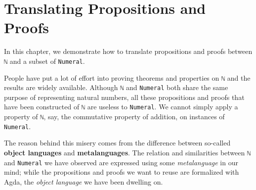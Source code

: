 \documentclass[\main/thesis.tex]{subfiles}
\begin{document}
\chapter{Translating Propositions and Proofs}\label{translation}

In this chapter, we demonstrate how to translate propositions and proofs between
\lstinline|ℕ| and a subset of \lstinline|Numeral|.

People have put a lot of effort into proving theorems and properties on
\lstinline|ℕ| and the results are widely available.
Although \lstinline|ℕ| and \lstinline|Numeral| both share the same purpose of
representing natural numbers, all these propositions and proofs that have been
constructed of \lstinline|ℕ| are useless to \lstinline|Numeral|.
We cannot simply apply a property of \lstinline|ℕ|, say,
the commutative property of addition, on instances of \lstinline|Numeral|.

The reason behind this misery comes from the difference between so-called
\textbf{object languages} and \textbf{metalanguages}.
The relation and similarities between \lstinline|ℕ| and \lstinline|Numeral|
we have observed are expressed using some \textit{metalanguage} in our mind;
while the propositions and proofs we want to reuse are formalized with Agda,
the \textit{object language} we have been dwelling on.

\begin{center}
    \begin{adjustbox}{max width=\textwidth}
    \end{adjustbox}
\end{center}
\end{document}
